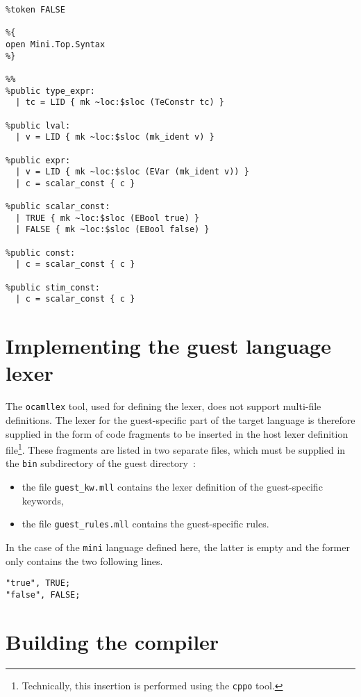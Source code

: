 \begin{lstlisting}[language={menhir},frame=single,basicstyle=\small,caption={File
    guest_parser.mly},label={lst:mini-eval}]
%token TRUE
%token FALSE

%{
open Mini.Top.Syntax
%}

%%
%public type_expr:
  | tc = LID { mk ~loc:$sloc (TeConstr tc) }

%public lval:
  | v = LID { mk ~loc:$sloc (mk_ident v) }

%public expr:
  | v = LID { mk ~loc:$sloc (EVar (mk_ident v)) }
  | c = scalar_const { c }

%public scalar_const:
  | TRUE { mk ~loc:$sloc (EBool true) }
  | FALSE { mk ~loc:$sloc (EBool false) }

%public const:
  | c = scalar_const { c }

%public stim_const: 
  | c = scalar_const { c }

\end{lstlisting}

\section{Implementing the guest language lexer}

The \texttt{ocamllex} tool, used for defining the lexer, does not support multi-file definitions.
The lexer for the guest-specific part of the target language is therefore supplied in the form of
code fragments to be inserted in the host lexer definition file\footnote{Technically, this insertion is
  performed using the \texttt{cppo} tool.}. These fragments are listed in two separate files, which
must be supplied in the \texttt{bin} subdirectory of the guest directory~:
\begin{itemize}
\item the file \texttt{guest_kw.mll} contains the lexer definition of the guest-specific keywords,
\item the file \texttt{guest_rules.mll} contains the guest-specific rules.
\end{itemize}

In the case of the \texttt{mini} language defined here, the latter is empty and the former only
contains the two following lines.

\begin{verbatim}
"true", TRUE;
"false", FALSE;
\end{verbatim}

\section{Building the compiler}

